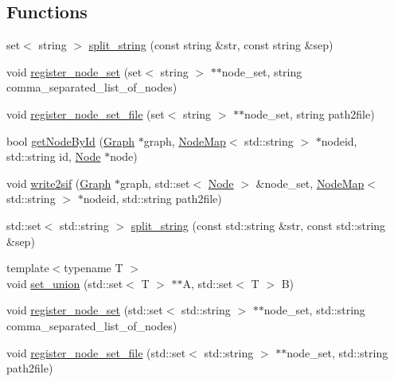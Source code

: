 \subsection*{Functions}
\begin{DoxyCompactItemize}
\item 
set$<$ string $>$ \hyperlink{namespacederegnet_aa12afb18c8703a823fee68c5b9a04bca}{split\+\_\+string} (const string \&str, const string \&sep)
\item 
void \hyperlink{namespacederegnet_a639799db7e485ee8cc15b5933be7b4ba}{register\+\_\+node\+\_\+set} (set$<$ string $>$ $\ast$$\ast$node\+\_\+set, string comma\+\_\+separated\+\_\+list\+\_\+of\+\_\+nodes)
\item 
void \hyperlink{namespacederegnet_a11d599a7ac217876cf35b3f6899532c0}{register\+\_\+node\+\_\+set\+\_\+file} (set$<$ string $>$ $\ast$$\ast$node\+\_\+set, string path2file)
\item 
bool \hyperlink{namespacederegnet_afefc9088a0ea47e8d8c1225b5de29244}{get\+Node\+By\+Id} (\hyperlink{namespacederegnet_a55b76c55bbabc682cbc61f8b9948799e}{Graph} $\ast$graph, \hyperlink{namespacederegnet_ae102b707ae1d6f83c639ece5e0dd5658}{Node\+Map}$<$ std\+::string $>$ $\ast$nodeid, std\+::string id, \hyperlink{namespacederegnet_a744bad34f2de9856d36715a445f027f3}{Node} $\ast$node)
\item 
void \hyperlink{namespacederegnet_a57ac2e918179ec5c93f20248daf39b04}{write2sif} (\hyperlink{namespacederegnet_a55b76c55bbabc682cbc61f8b9948799e}{Graph} $\ast$graph, std\+::set$<$ \hyperlink{namespacederegnet_a744bad34f2de9856d36715a445f027f3}{Node} $>$ \&node\+\_\+set, \hyperlink{namespacederegnet_ae102b707ae1d6f83c639ece5e0dd5658}{Node\+Map}$<$ std\+::string $>$ $\ast$nodeid, std\+::string path2file)
\item 
std\+::set$<$ std\+::string $>$ \hyperlink{namespacederegnet_ae4879ebf699f46d51e52b95f1e6f79da}{split\+\_\+string} (const std\+::string \&str, const std\+::string \&sep)
\item 
{\footnotesize template$<$typename T $>$ }\\void \hyperlink{namespacederegnet_a4358b76b371b698be243476cdabc15ab}{set\+\_\+union} (std\+::set$<$ T $>$ $\ast$$\ast$A, std\+::set$<$ T $>$ B)
\item 
void \hyperlink{namespacederegnet_a3ca4926831aa9ca021d1b9230429e8bd}{register\+\_\+node\+\_\+set} (std\+::set$<$ std\+::string $>$ $\ast$$\ast$node\+\_\+set, std\+::string comma\+\_\+separated\+\_\+list\+\_\+of\+\_\+nodes)
\item 
void \hyperlink{namespacederegnet_afbda9b78d4072e2058fdd242c4783cf1}{register\+\_\+node\+\_\+set\+\_\+file} (std\+::set$<$ std\+::string $>$ $\ast$$\ast$node\+\_\+set, std\+::string path2file)
\end{DoxyCompactItemize}


